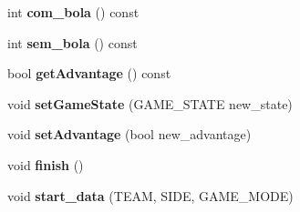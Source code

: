 \begin{DoxyCompactItemize}
\item 
int {\bfseries com\+\_\+bola} () const \hypertarget{classFutData_ae4ed5ccf7576337fc4c663f0aee9e6f3}{}\label{classFutData_ae4ed5ccf7576337fc4c663f0aee9e6f3}

\item 
int {\bfseries sem\+\_\+bola} () const \hypertarget{classFutData_a9bb87f3a303a4548e42b48bb926503fa}{}\label{classFutData_a9bb87f3a303a4548e42b48bb926503fa}

\item 
bool {\bfseries get\+Advantage} () const \hypertarget{classFutData_af11ce4dccdff469641b2c4c8d6a59e21}{}\label{classFutData_af11ce4dccdff469641b2c4c8d6a59e21}

\item 
void {\bfseries set\+Game\+State} (G\+A\+M\+E\+\_\+\+S\+T\+A\+TE new\+\_\+state)\hypertarget{classFutData_a860ec271342818ead5b7a26eb26711b4}{}\label{classFutData_a860ec271342818ead5b7a26eb26711b4}

\item 
void {\bfseries set\+Advantage} (bool new\+\_\+advantage)\hypertarget{classFutData_a32478823c69b4fe591358422135b1a9e}{}\label{classFutData_a32478823c69b4fe591358422135b1a9e}

\item 
void {\bfseries finish} ()\hypertarget{classFutData_ad905c3583ad548ed955bd227a4f17a7c}{}\label{classFutData_ad905c3583ad548ed955bd227a4f17a7c}

\item 
void {\bfseries start\+\_\+data} (T\+E\+AM, S\+I\+DE, G\+A\+M\+E\+\_\+\+M\+O\+DE)\hypertarget{classFutData_a2195a9a52490726d285a9295316af928}{}\label{classFutData_a2195a9a52490726d285a9295316af928}

\end{DoxyCompactItemize}
